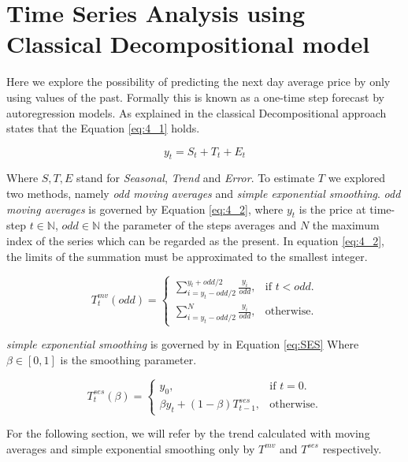 \section{Time Series Analysis using Classical Decompositional model}

Here we explore the possibility of predicting the next day average price by only using values of the past. Formally this is known as a one-time step forecast
by autoregression models. As explained in \cite{makridakis2008forecasting} the classical Decompositional approach states that the Equation \ref{eq:4_1} holds.  

\begin{equation}
y_{t}=S_{t}+T_{t}+E_{t}
\label{eq:4_1}
\end{equation}

Where $S,T,E$ stand for \textit{Seasonal}, \textit{Trend} and \textit{Error}. To estimate $T$ we explored two methods, namely \emph{odd moving averages} and \emph{simple exponential smoothing}. \emph{odd moving averages} is governed by Equation \ref{eq:4_2}, where $y_{t}$ is the price at time-step $t \in \mathbb{N}$, $odd \in \mathbb{N}$ the parameter of the steps averages and $N$ the maximum index of the series which can be regarded as the present. In equation \ref{eq:4_2}, the limits of the summation must be approximated to the smallest integer.


\begin{equation}
T^{mv}_{t}(odd)=\begin{cases}
\sum_{i=y_{t}-odd/2}^{y_{t}+odd/2} \frac{y_{i} }{odd} , & \text{if $t<odd$}.\\
\sum_{i=y_{t}-odd/2}^{N} \frac{y_{i} }{odd}, & \text{otherwise}.
\end{cases}
\label{eq:4_2}
\end{equation}

\emph{simple exponential smoothing} is governed by in Equation \ref{eq:SES} Where $\beta \in [0,1]$ is the smoothing parameter.


\begin{equation}
T^{ses}_{t}(\beta)=\begin{cases}
y_{0}  , & \text{if $t=0$}.\\
\beta y_{t}+(1-\beta)T^{ses}_{t-1}, & \text{otherwise}.
\end{cases}
\label{eq:SES}
\end{equation}

For the following section, we will refer by the trend calculated with moving averages and simple exponential smoothing only by $T^{mv}$ and $T^{ses}$ respectively.



